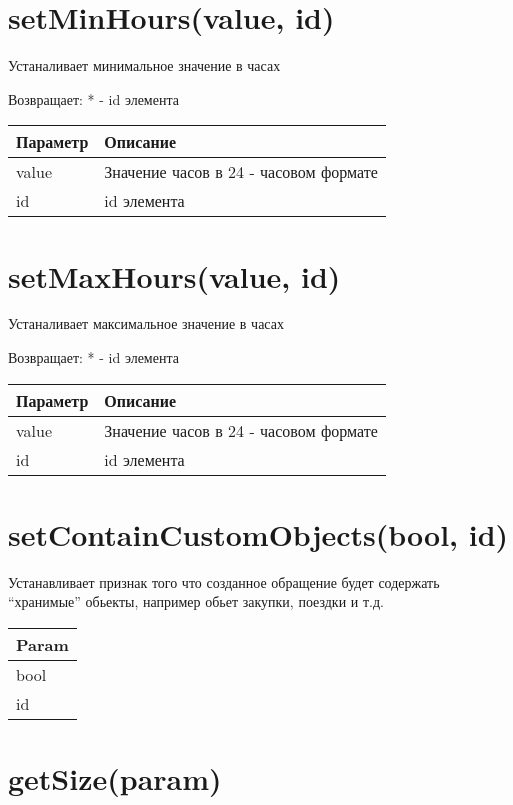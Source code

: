 \hypertarget{setminhoursvalue-id}{%
\section{setMinHours(value, id)}\label{setminhoursvalue-id}}

Устаналивает минимальное значение в часах

Возвращает: * - id элемента

\begin{longtable}[]{@{}ll@{}}
\toprule
Параметр & Описание\tabularnewline
\midrule
\endhead
value & Значение часов в 24 - часовом формате\tabularnewline
id & id элемента\tabularnewline
\bottomrule
\end{longtable}

\hypertarget{setmaxhoursvalue-id}{%
\section{setMaxHours(value, id)}\label{setmaxhoursvalue-id}}

Устаналивает максимальное значение в часах

Возвращает: * - id элемента

\begin{longtable}[]{@{}ll@{}}
\toprule
Параметр & Описание\tabularnewline
\midrule
\endhead
value & Значение часов в 24 - часовом формате\tabularnewline
id & id элемента\tabularnewline
\bottomrule
\end{longtable}

\hypertarget{setcontaincustomobjectsbool-id}{%
\section{setContainCustomObjects(bool, id)}\label{setcontaincustomobjectsbool-id}}

Устанавливает признак того что созданное обращение будет содержать
``хранимые'' обьекты, например обьет закупки, поездки и т.д.


\begin{longtable}[]{@{}l@{}}
\toprule
Param\tabularnewline
\midrule
\endhead
bool\tabularnewline
id\tabularnewline
\bottomrule
\end{longtable}

\hypertarget{getsizeparam}{%
\section{getSize(param)}\label{getsizeparam}}

